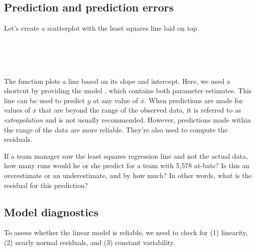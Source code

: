 \documentclass[11pt]{article}
\begin{document}
\subsection*{Prediction and prediction errors}

Let's create a scatterplot with the least squares line laid on top.

\ttfamily\noindent
\hlstd{}\hspace*{\fill}\\
\hlstd{}\hlkeyword{(}\hlargument{=}{\ }\hlkeyword{\usebox{\hlnormalsizeboxdollar}}\hlkeyword{,}{\ }\hlargument{=}{\ }\hlkeyword{\usebox{\hlnormalsizeboxdollar}}\hlkeyword{)}\hspace*{\fill}\\
\hlstd{}\hlkeyword{(}\hlkeyword{)}\hspace*{\fill}\\
\normalfont

The function \texttt{} plots a line based on its slope and intercept.  Here, we used a shortcut by providing the model \texttt{}, which contains both parameter estimates. This line can be used to predict $y$ at any value of $x$.  When predictions are made for values of $x$ that are beyond the range of the observed data, it is referred to as \emph{extrapolation} and is not usually recommended.  However, predictions made within the range of the data are more reliable.  They're also used to compute the residuals.

\begin{exercise}
If a team manager saw the least squares regression line and not the actual data, how many runs would he or she predict for a team with 5,578 at-bats? Is this an overestimate or an underestimate, and by how much? In other words, what is the residual for this prediction?
\end{exercise}

%

\subsection*{Model diagnostics}

To assess whether the linear model is reliable, we need to check for  (1) linearity, (2) nearly normal residuals, and (3) constant variability.
\end{document}
